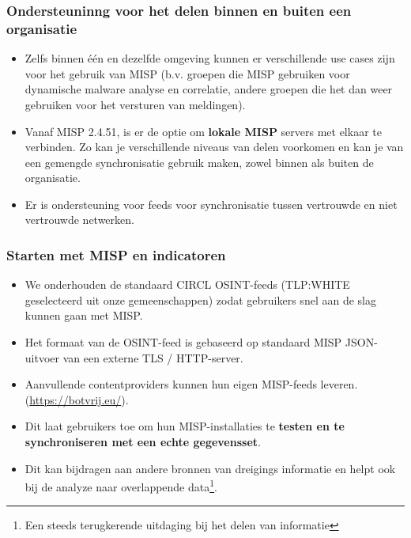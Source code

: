\begin{frame}
\frametitle{Ondersteuninng voor het delen binnen en buiten een organisatie}
\begin{itemize}
        \item Zelfs binnen één en dezelfde omgeving kunnen er verschillende use cases zijn voor het gebruik van MISP (b.v. groepen die MISP gebruiken voor dynamische malware analyse en correlatie, andere groepen die het dan weer gebruiken voor het versturen van meldingen).
        \item Vanaf MISP 2.4.51, is er de optie om {\bf lokale MISP} servers met elkaar te verbinden. Zo kan je verschillende niveaus van delen voorkomen en kan je van een gemengde synchronisatie gebruik maken, zowel binnen als buiten de organisatie.
        \item Er is ondersteuning voor feeds voor synchronisatie tussen vertrouwde en niet vertrouwde netwerken.
\end{itemize}
\end{frame}

\begin{frame}
        \frametitle{Starten met MISP en indicatoren}
        \begin{itemize}
                \item We onderhouden de standaard CIRCL OSINT-feeds (TLP:WHITE geselecteerd uit onze gemeenschappen) zodat gebruikers snel aan de slag kunnen gaan met MISP.
                \item Het formaat van de OSINT-feed is gebaseerd op standaard MISP JSON-uitvoer van een externe TLS / HTTP-server.
                \item Aanvullende contentproviders kunnen hun eigen MISP-feeds leveren. (\url{https://botvrij.eu/}).
                \item Dit laat gebruikers toe om hun MISP-installaties te {\bf testen en te synchroniseren met een echte gegevensset}.
                \item Dit kan bijdragen aan andere bronnen van dreigings informatie en helpt ook bij de analyze naar overlappende data\footnote{Een steeds terugkerende uitdaging bij het delen van informatie}.
        \end{itemize}
\end{frame}


